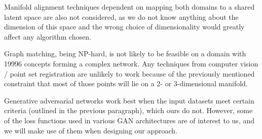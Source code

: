 Manifold alignment techniques dependent on mapping both domains to a shared latent space are also not considered, as we do not know anything about the dimension of this space and the wrong choice of dimensionality would greatly affect any algorithm chosen.

Graph matching, being NP-hard, is not likely to be feasible on a domain with 19996 concepts forming a complex network. Any techniques from computer vision / point set registration are unlikely to work because of the previously mentioned constraint that most of those points will lie on a 2- or 3-dimensional manifold. 

Generative adversarial networks work best when the input datasets meet certain criteria (outlined in the previous paragraph), which ours do not. However, some of the loss functions used in various GAN architectures are of interest to us, and we will make use of them when designing our approach. 

